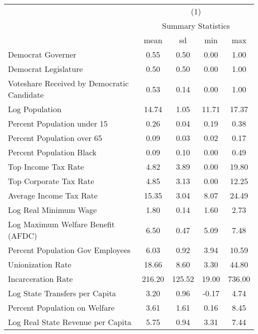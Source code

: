 \begin{tabular}{l*{1}{cccc}} \toprule
                    &\multicolumn{4}{c}{(1)}                            \\
                    &\multicolumn{4}{c}{Summary Statistics}             \\
                    &        mean&          sd&         min&         max\\
\midrule
Democrat Governer   &        0.55&        0.50&        0.00&        1.00\\
Democrat Legislature&        0.50&        0.50&        0.00&        1.00\\
Voteshare Received by Democratic Candidate&        0.53&        0.14&        0.00&        1.00\\
Log Population      &       14.74&        1.05&       11.71&       17.37\\
Percent Population under 15&        0.26&        0.04&        0.19&        0.38\\
Percent Population over 65&        0.09&        0.03&        0.02&        0.17\\
Percent Population Black&        0.09&        0.10&        0.00&        0.49\\
Top Income Tax Rate &        4.82&        3.89&        0.00&       19.80\\
Top Corporate Tax Rate&        4.85&        3.13&        0.00&       12.25\\
Average Income Tax Rate&       15.35&        3.04&        8.07&       24.49\\
Log Real Minimum Wage&        1.80&        0.14&        1.60&        2.73\\
Log Maximum Welfare Benefit (AFDC)&        6.50&        0.47&        5.09&        7.48\\
Percent Population Gov Employees&        6.03&        0.92&        3.94&       10.59\\
Unionization Rate   &       18.66&        8.60&        3.30&       44.80\\
Incarceration Rate  &      216.20&      125.52&       19.00&      736.00\\
Log State Transfers per Capita&        3.20&        0.96&       -0.17&        4.74\\
Percent Population on Welfare&        3.61&        1.61&        0.16&        8.45\\
Log Real State Revenue per Capita&        5.75&        0.94&        3.31&        7.44\\

\end{tabular}
